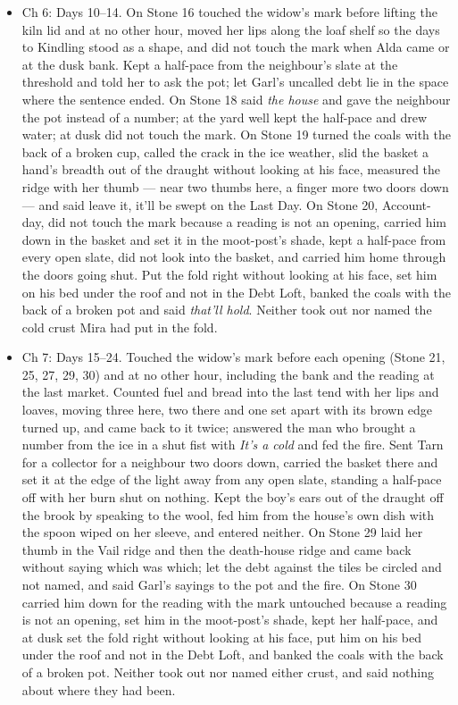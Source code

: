\documentclass{design/chronicle}
\begin{document}
{\begin{itemize}[leftmargin=1.4em,itemsep=1pt,topsep=3pt,parsep=0pt]
\item Ch 6: Days 10--14. On Stone 16 touched the widow’s mark before lifting the kiln lid and at no other hour, moved her lips along the loaf shelf so the days to Kindling stood as a shape, and did not touch the mark when Alda came or at the dusk bank. Kept a half-pace from the neighbour’s slate at the threshold and told her to ask the pot; let Garl’s uncalled debt lie in the space where the sentence ended. On Stone 18 said \emph{the house} and gave the neighbour the pot instead of a number; at the yard well kept the half-pace and drew water; at dusk did not touch the mark. On Stone 19 turned the coals with the back of a broken cup, called the crack in the ice weather, slid the basket a hand’s breadth out of the draught without looking at his face, measured the ridge with her thumb --- near two thumbs here, a finger more two doors down --- and said leave it, it’ll be swept on the Last Day. On Stone 20, Account-day, did not touch the mark because a reading is not an opening, carried him down in the basket and set it in the moot-post’s shade, kept a half-pace from every open slate, did not look into the basket, and carried him home through the doors going shut. Put the fold right without looking at his face, set him on his bed under the roof and not in the Debt Loft, banked the coals with the back of a broken pot and said \emph{that’ll hold}. Neither took out nor named the cold crust Mira had put in the fold.

\end{itemize}

\begin{itemize}[leftmargin=1.4em,itemsep=1pt,topsep=3pt,parsep=0pt]

\item Ch 7: Days 15--24. Touched the widow’s mark before each opening (Stone 21, 25, 27, 29, 30) and at no other hour, including the bank and the reading at the last market. Counted fuel and bread into the last tend with her lips and loaves, moving three here, two there and one set apart with its brown edge turned up, and came back to it twice; answered the man who brought a number from the ice in a shut fist with \emph{It’s a cold} and fed the fire. Sent Tarn for a collector for a neighbour two doors down, carried the basket there and set it at the edge of the light away from any open slate, standing a half-pace off with her burn shut on nothing. Kept the boy’s ears out of the draught off the brook by speaking to the wool, fed him from the house’s own dish with the spoon wiped on her sleeve, and entered neither. On Stone 29 laid her thumb in the Vail ridge and then the death-house ridge and came back without saying which was which; let the debt against the tiles be circled and not named, and said Garl’s sayings to the pot and the fire. On Stone 30 carried him down for the reading with the mark untouched because a reading is not an opening, set him in the moot-post’s shade, kept her half-pace, and at dusk set the fold right without looking at his face, put him on his bed under the roof and not in the Debt Loft, and banked the coals with the back of a broken pot. Neither took out nor named either crust, and said nothing about where they had been.


\end{itemize}}
\end{document}
